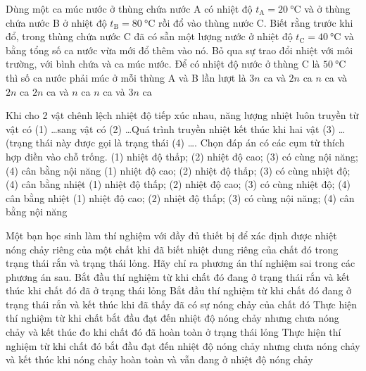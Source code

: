 \begin{ex}
	Dùng một ca múc nước ở thùng chứa nước A có nhiệt độ $t_{\mathrm{A}}=\SI{20}{\celsius}$ và ở thùng chứa nước B ở nhiệt độ $t_{\mathrm{B}}=\SI{80}{\celsius}$ rồi đổ vào thùng nước C. Biết rằng trước khi đổ, trong thùng chứa nước C đã có sẵn một lượng nước ở nhiệt độ $t_{\mathrm{C}}=\SI{40}{\celsius}$ và bằng tổng số ca nước vừa mới đổ thêm vào nó. Bỏ qua sự trao đổi nhiệt với môi trường, với bình chứa và ca múc nước. Để có nhiệt độ nước ở thùng C là $\SI{50}{\celsius}$ thì số ca nước phải múc ở mỗi thùng A và B lần lượt là
	\choice
	{$3n$ ca và $2n$ ca}
	{\True $n$ ca và $2n$ ca}
	{$2n$ ca và $n$ ca}
	{$n$ ca và $3n$ ca}
\end{ex}
\begin{ex}
Khi cho 2 vật chênh lệch nhiệt độ tiếp xúc nhau, năng lượng nhiệt luôn truyền từ vật có (1) \dots sang vật có (2) \dots Quá trình truyền nhiệt kết thúc khi hai vật (3) \dots (trạng thái này được gọi là trạng thái (4) \dots. Chọn đáp án có các cụm từ thích hợp điền vào chỗ trống.	
	\choice
	{(1) nhiệt độ thấp;	(2) nhiệt độ cao; (3) có cùng nội năng; (4) cân bằng nội năng}
	{\True (1) nhiệt độ cao;	(2) nhiệt độ thấp; (3) có cùng nhiệt độ; (4) cân bằng nhiệt}
	{(1) nhiệt độ thấp; (2) nhiệt độ cao; (3) có cùng nhiệt độ; (4) cân bằng nhiệt}
	{(1) nhiệt độ cao; (2) nhiệt độ thấp; (3) có cùng nội năng; (4) cân bằng nội năng}
	\loigiai{}
\end{ex}
\begin{ex}
	Một bạn học sinh làm thí nghiệm với đầy đủ thiết bị để xác định được nhiệt nóng chảy riêng của một chất khi đã biết nhiệt dung riêng của chất đó trong trạng thái rắn và trạng thái lỏng. Hãy chỉ ra phương án thí nghiệm sai trong các phương án sau.
	\choice
	{Bắt đầu thí nghiệm từ khi chất đó đang ở trạng thái rắn và kết thúc khi chất đó đã ở trạng thái lỏng}
	{\True Bắt đầu thí nghiệm từ khi chất đó đang ở trạng thái rắn và kết thúc khi đã thấy đã có sự nóng chảy của chất đó}
	{Thực hiện thí nghiệm từ khi chất bắt đầu đạt đến nhiệt độ nóng chảy nhưng chưa nóng chảy và kết thúc đo khi chất đó đã hoàn toàn ở trạng thái lỏng}
	{Thực hiện thí nghiệm từ khi chất đó bắt đầu đạt đến nhiệt độ nóng chảy nhưng chưa nóng chảy và kết thúc khi nóng chảy hoàn toàn và vẫn đang ở nhiệt độ nóng chảy}
	\loigiai{}
\end{ex}
